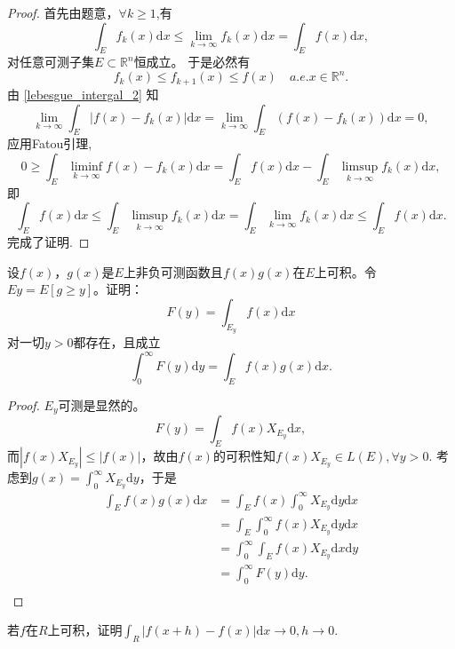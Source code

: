 \begin{proof}
首先由题意，$\forall k\geq1$,有
$$\int_Ef_k(x)\mathrm{d}x\leq\lim_{k\to\infty}f_k(x)\mathrm{d}x=\int_Ef(x)\mathrm{d}x,$$对任意可测子集$E\subset\mathbb{R}^n$恒成立。
于是必然有
\begin{equation}\label{lebesgue_intergal_2}
f_k(x)\leq f_{k+1}(x) \leq f(x)\quad a.e.x\in\mathbb{R}^n.
\end{equation}
由 \eqref{lebesgue_intergal_2} 知
\[
  \lim_{k\to\infty}\int_E|f(x)-f_k(x)|\mathrm{d}x
  = \lim_{k\to\infty} \int_E(f(x)-f_k(x))\mathrm{d}x = 0,
\]
应用Fatou引理,
\[
0\geq\int_E\liminf_{k\to\infty}f(x)-f_k(x)\mathrm{d}x=\int_Ef(x)\mathrm{d}x-\int_E\limsup_{k\to\infty}f_k(x)\mathrm{d}x,
\]
即 
\[
\int_Ef(x)\mathrm{d}x
\leq\int_E\limsup_{k\to\infty}f_k(x)\mathrm{d}x
= \int_E\lim_{k\to\infty}f_k(x)\mathrm{d}x
\leq\int_Ef(x)\mathrm{d}x.
\] 
完成了证明.
\end{proof}

\begin{exercise}
设$f(x)$，$g(x)$是$E$上非负可测函数且$f(x)g(x)$在$E$上可积。令$Ey=E[g\geq y]$。证明：$$F(y)=\int_{E_y}f(x)\mathrm{d}x$$对一切$y>0$都存在，且成立
$$\int_0^{\infty}F(y)\mathrm{d}y=\int_Ef(x)g(x)\mathrm{d}x.$$
\end{exercise}

\begin{proof}
  $E_y$可测是显然的。$$F(y)=\int_Ef(x)X_{E_y}\mathrm{d}x,$$
而$|f(x)X_{E_y}|\leq|f(x)|$，故由$f(x)$的可积性知$f(x)X_{E_y}\in L(E),\forall y>0.$
考虑到$g(x)=\int_0^{\infty}X_{E_y}\mathrm{d}y$，于是
\begin{align*}
\int_Ef(x)g(x)\mathrm{d}x&=\int_Ef(x)\int_0^{\infty}X_{E_y}\mathrm{d}y\mathrm{d}x\\
&=\int_E\int_0^{\infty}f(x)X_{E_y}\mathrm{d}y\mathrm{d}x\\
&=\int_0^{\infty}\int_Ef(x)X_{E_y}\mathrm{d}x\mathrm{d}y\\
&=\int_0^{\infty}F(y)\mathrm{d}y.\\
\end{align*}
\end{proof}


\begin{exercise}
若$f$在$R$上可积，证明$\int_R|f(x+h)-f(x)|\mathrm{d}x\to0,h\to0$.
\end{exercise}

